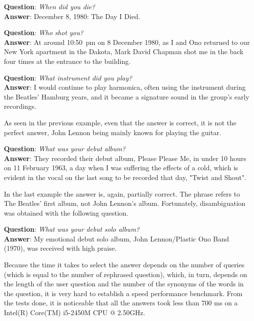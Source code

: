 \textbf{Question}: {\em When did you die?}
\\
\textbf{Answer}: December 8, 1980: The Day I Died.

\textbf{Question}: {\em Who shot you?}
\\
\textbf{Answer}: At around 10:50 pm on 8 December 1980, as I and Ono returned to our New York apartment in the Dakota, Mark David Chapman shot me in the back four times at the entrance to the building.

\textbf{Question}: {\em What instrument did you play?}
\\
\textbf{Answer}: I would continue to play harmonica, often using the instrument during the Beatles' Hamburg years, and it became a signature sound in the group's early recordings.

As seen in the previous example, even that the answer is correct, it is not the perfect answer, John Lennon being mainly known for playing the guitar.

\textbf{Question}: {\em What was your debut album?}
\\
\textbf{Answer}: They recorded their debut album, Please Please Me, in under 10 hours on 11 February 1963, a day when I was suffering the effects of a cold, which is evident in the vocal on the last song to be recorded that day, "Twist and Shout".

In the last example the answer is, again, partially correct. The phrase refers to The Beatles' first album, not John Lennon's album. Fortunately, disambiguation was obtained with the following question.

\textbf{Question}: {\em What was your debut solo album?}
\\
\textbf{Answer}: My emotional debut solo album, John Lennon/Plastic Ono Band (1970), was received with high praise.

Because the time it takes to select the answer depends on the number of queries (which is equal to the number of rephrased question), which, in turn, depends on the length of the user question and the number of the synonyms of the words in the question, it is very hard to establish a speed performance benchmark. From the tests done, it is noticeable that all the answers took less than 700 ms on a Intel(R) Core(TM) i5-2450M CPU @ 2.50GHz.
